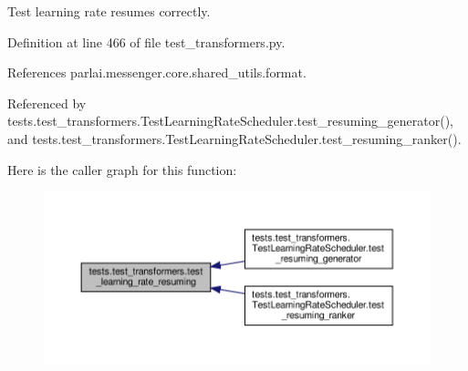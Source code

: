 \begin{DoxyVerb}Test learning rate resumes correctly.\end{DoxyVerb}
 

Definition at line 466 of file test\+\_\+transformers.\+py.



References parlai.\+messenger.\+core.\+shared\+\_\+utils.\+format.



Referenced by tests.\+test\+\_\+transformers.\+Test\+Learning\+Rate\+Scheduler.\+test\+\_\+resuming\+\_\+generator(), and tests.\+test\+\_\+transformers.\+Test\+Learning\+Rate\+Scheduler.\+test\+\_\+resuming\+\_\+ranker().

Here is the caller graph for this function\+:
\nopagebreak
\begin{figure}[H]
\begin{center}
\leavevmode
\includegraphics[width=350pt]{namespacetests_1_1test__transformers_a8d6cf0022229f5deba37f23f30601117_icgraph}
\end{center}
\end{figure}
